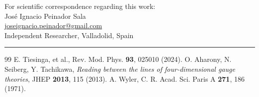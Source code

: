 \documentclass[12pt,a4paper]{article}
\begin{document}
For scientific correspondence regarding this work: \\
José Ignacio Peinador Sala \\
\href{mailto:joseignacio.peinador@gmail.com}{joseignacio.peinador@gmail.com} \\
Independent Researcher, Valladolid, Spain

\vspace{0.5cm}
\hrule
\vspace{0.5cm}

\begin{thebibliography}{99}
 E. Tiesinga, et al., Rev. Mod. Phys. \textbf{93}, 025010 (2024).
 O. Aharony, N. Seiberg, Y. Tachikawa, \textit{Reading between the lines of four-dimensional gauge theories}, JHEP \textbf{2013}, 115 (2013).
 A. Wyler, C. R. Acad. Sci. Paris A \textbf{271}, 186 (1971).
\end{thebibliography}
\end{document}
